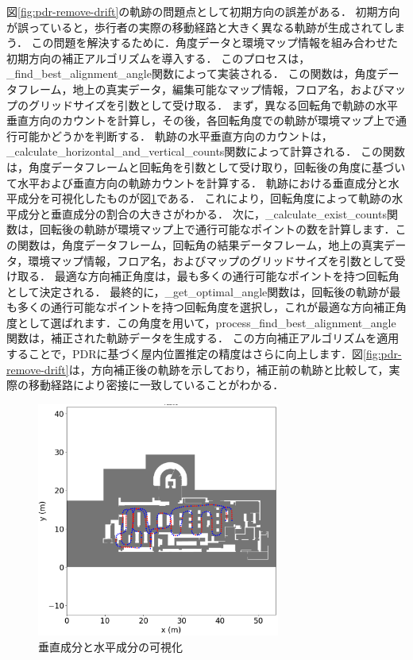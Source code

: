 \documentclass[Japanese]{dicomopapers}
\begin{document}
図\ref{fig:pdr-remove-drift}の軌跡の問題点として初期方向の誤差がある．
初期方向が誤っていると，歩行者の実際の移動経路と大きく異なる軌跡が生成されてしまう．
この問題を解決するために．角度データと環境マップ情報を組み合わせた初期方向の補正アルゴリズムを導入する．
このプロセスは，\_find\_best\_alignment\_angle関数によって実装される．
この関数は，角度データフレーム，地上の真実データ，編集可能なマップ情報，フロア名，およびマップのグリッドサイズを引数として受け取る．
まず，異なる回転角で軌跡の水平垂直方向のカウントを計算し，その後，各回転角度での軌跡が環境マップ上で通行可能かどうかを判断する．
軌跡の水平垂直方向のカウントは，\_calculate\_horizontal\_and\_vertical\_counts関数によって計算される．
この関数は，角度データフレームと回転角を引数として受け取り，回転後の角度に基づいて水平および垂直方向の軌跡カウントを計算する．
軌跡における垂直成分と水平成分を可視化したものが図\ref{fig:color}である．
これにより，回転角度によって軌跡の水平成分と垂直成分の割合の大きさがわかる．
次に，\_calculate\_exist\_counts関数は，回転後の軌跡が環境マップ上で通行可能なポイントの数を計算します．この関数は，角度データフレーム，回転角の結果データフレーム，地上の真実データ，環境マップ情報，フロア名，およびマップのグリッドサイズを引数として受け取る．
最適な方向補正角度は，最も多くの通行可能なポイントを持つ回転角として決定される．
最終的に，\_get\_optimal\_angle関数は，回転後の軌跡が最も多くの通行可能なポイントを持つ回転角度を選択し，これが最適な方向補正角度として選ばれます．この角度を用いて，process\_find\_best\_alignment\_angle関数は，補正された軌跡データを生成する．
この方向補正アルゴリズムを適用することで，PDRに基づく屋内位置推定の精度はさらに向上します．図\ref{fig:pdr-remove-drift}は，方向補正後の軌跡を示しており，補正前の軌跡と比較して，実際の移動経路により密接に一致していることがわかる．

\begin{figure}[h]
	\centering
	\includegraphics[width=80mm]{image/rb.png}
	\caption{垂直成分と水平成分の可視化}    \label{fig:color}
\end{figure}
\end{document}
